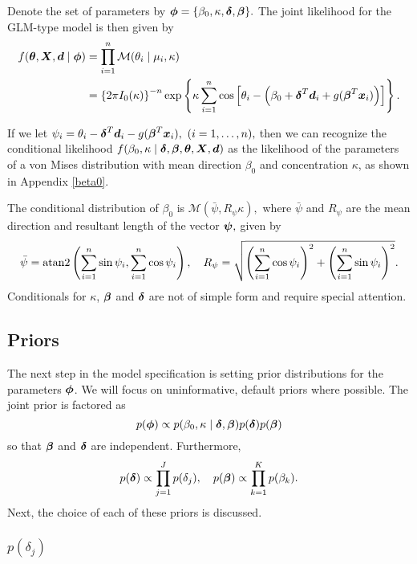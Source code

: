 Denote the set of parameters by \( \boldsymbol{\phi} =  \{ \beta_0, \kappa, \boldsymbol{\delta}, \boldsymbol{\beta} \}.\) The joint likelihood for the GLM-type model is then given by
\begin{align}
f(\boldsymbol{\theta}, \boldsymbol{X}, \boldsymbol{d} \mid \boldsymbol{\phi}) &=  \prod_{i=1}^{n} \mathcal{M}(\theta_i \mid \mu_i, \kappa) \\
&=  \left\lbrace 2 \pi I_0(\kappa) \right\rbrace^{-n} \exp \left\lbrace \kappa \sum_{i=1}^{n} \cos \left[ \theta_i - \left( \beta_0 +  \boldsymbol{\delta}^T \boldsymbol{d}_i + g(\boldsymbol{\beta}^T \boldsymbol{x}_i) \right) \right]  \right\rbrace.
\end{align}

If we let \( \psi_i = \theta_i - \boldsymbol{\delta}^T\boldsymbol{d}_i - g(\boldsymbol{\beta}^T \boldsymbol{x}_i), ~ ( i = 1, \dots, n),\) then we can recognize the conditional likelihood \( f(\beta_0, \kappa \mid \boldsymbol{\delta}, \boldsymbol{\beta}, \boldsymbol{\theta}, \boldsymbol{X}, \boldsymbol{d}) \) as the likelihood of the parameters of a von Mises distribution with mean direction \( \beta_0 \) and concentration \( \kappa \), as shown in Appendix \ref{beta0}.

The conditional distribution of \( \beta_0 \) is \( \mathcal{M}(\bar\psi, R_{\psi} \kappa), \) where \( \bar\psi \) and \( R_\psi \) are the mean direction and resultant length of the vector \( \boldsymbol{\psi}, \) given by  \[ \bar\psi =  \operatorname{atan2} \left( \sum_{i=1}^n \sin\psi_i, \sum_{i=1}^n \cos\psi_i \right), \quad R_\psi = \sqrt{ \left( \sum_{i=1}^n \cos\psi_i \right)^2 +  \left( \sum_{i=1}^n \sin\psi_i \right)^2 }.\]
Conditionals for \( \kappa \), \( \boldsymbol{\beta} \) and \( \boldsymbol{\delta} \) are not of simple form and require special attention. \label{condbeta0}

\subsection{Priors}

The next step in the model specification is setting prior distributions for the parameters \( \boldsymbol{\phi} \). We will focus on uninformative, default priors where possible. The joint prior is factored as
\begin{equation}
p(\boldsymbol{\phi}) \propto p(\beta_0, \kappa \mid \boldsymbol{\delta}, \boldsymbol{\beta}) p(\boldsymbol{\delta}) p(\boldsymbol{\beta})
\end{equation}
so that \( \boldsymbol{\beta} \) and \( \boldsymbol{\delta} \) are independent. Furthermore,
\begin{equation}
p(\boldsymbol{\delta}) \propto \prod_{j=1}^J p(\delta_j), \quad p(\boldsymbol{\beta}) \propto \prod_{k=1}^K p(\beta_k).
\end{equation}
Next, the choice of each of these priors is discussed.

\subsubsection{$p(\delta_j)$}

